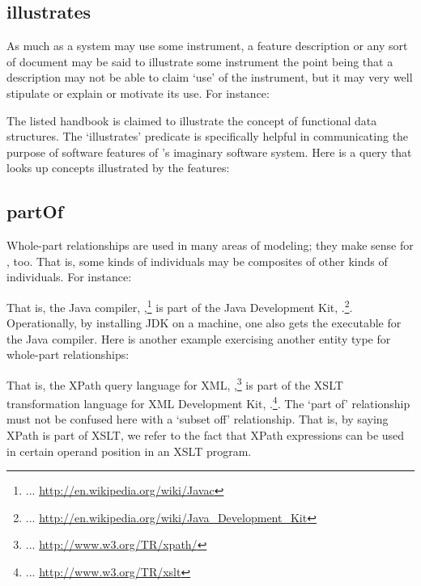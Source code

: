 
\subsection{illustrates}
\label{S:illustrates}

As much as a system may use some instrument, a feature description or
any sort of document may be said to illustrate some instrument the
point being that a description may not be able to claim `use' of the
instrument, but it may very well stipulate or explain or motivate its
use. For instance:


\noindent
The listed handbook is claimed to illustrate the concept of functional
data structures. The `illustrates' predicate is specifically helpful
in communicating the purpose of software features of \ooo{}'s
imaginary software system. Here is a query that looks up concepts
illustrated by the features:




\subsection{partOf}
\label{S:partOf}

Whole-part relationships are used in many areas of modeling; they make
sense for \solasote, too. That is, some kinds of \solasote{}
individuals may be composites of other kinds of \solasote{}
individuals. For instance:


\noindent
That is, the Java compiler,
,\footnote{... 
  \url{http://en.wikipedia.org/wiki/Javac}} is part of the Java
Development Kit, .\footnote{... 
  \url{http://en.wikipedia.org/wiki/Java_Development_Kit}}. Operationally,
by installing JDK on a machine, one also gets the executable for the
Java compiler. Here is another example exercising another entity type
for whole-part relationships:


\noindent
That is, the XPath query language for XML,
,\footnote{... 
  \url{http://www.w3.org/TR/xpath/}} is part of the XSLT
transformation language for XML
Development Kit, .\footnote{... 
  \url{http://www.w3.org/TR/xslt}}. The `part of' relationship must not
be confused here with a `subset off' relationship. That is, by saying
XPath is part of XSLT, we refer to the fact that XPath expressions can
be used in certain operand position in an XSLT program. 

